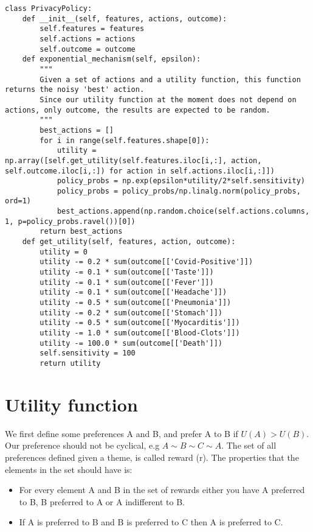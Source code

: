 \documentclass[a4paper, 12pt]{extarticle}
\begin{document}
\begin{lstlisting}
class PrivacyPolicy:
    def __init__(self, features, actions, outcome):
        self.features = features
        self.actions = actions
        self.outcome = outcome
    def exponential_mechanism(self, epsilon):
        """
        Given a set of actions and a utility function, this function returns the noisy 'best' action.
        Since our utility function at the moment does not depend on actions, only outcome, the results are expected to be random.  
        """
        best_actions = []
        for i in range(self.features.shape[0]):
            utility = np.array([self.get_utility(self.features.iloc[i,:], action, self.outcome.iloc[i,:]) for action in self.actions.iloc[i,:]])
            policy_probs = np.exp(epsilon*utility/2*self.sensitivity)
            policy_probs = policy_probs/np.linalg.norm(policy_probs, ord=1)
            best_actions.append(np.random.choice(self.actions.columns, 1, p=policy_probs.ravel())[0])
        return best_actions
    def get_utility(self, features, action, outcome):
        utility = 0
        utility -= 0.2 * sum(outcome[['Covid-Positive']])
        utility -= 0.1 * sum(outcome[['Taste']])
        utility -= 0.1 * sum(outcome[['Fever']])
        utility -= 0.1 * sum(outcome[['Headache']])
        utility -= 0.5 * sum(outcome[['Pneumonia']])
        utility -= 0.2 * sum(outcome[['Stomach']])
        utility -= 0.5 * sum(outcome[['Myocarditis']])
        utility -= 1.0 * sum(outcome[['Blood-Clots']])
        utility -= 100.0 * sum(outcome[['Death']])
        self.sensitivity = 100
        return utility
\end{lstlisting}



\section*{Utility function}
We first define some preferences A and B, and prefer A to B if  $U(A)>U(B)$. Our preference should not be cyclical, e.g $A \sim B \sim C \sim A$. The set of all preferences defined given a theme, is called reward (r).
The properties that the elements in the set should have is: 

\begin{itemize}
    \item For every element A and B in the set of rewards either you have A preferred to B, B preferred to A or A indifferent to B.
    \item If A is preferred to B and B is preferred to C then A is preferred to C.
\end{itemize}
\end{document}
